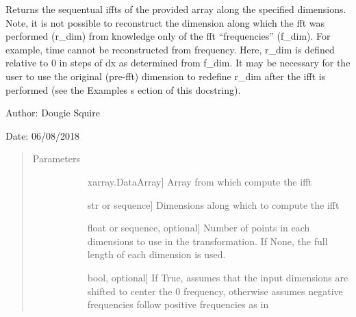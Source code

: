 \documentclass[letterpaper,10pt,english]{sphinxmanual}
\begin{document}

\begin{fulllineitems}
\label{\detokenize{utils_doc:utils.ifft}}
Returns the sequentual iffts of the provided array along the specified dimensions. Note, it is                 not possible to reconstruct the  dimension along which the fft was performed (r\_dim) from                 knowledge only of the fft “frequencies” (f\_dim). For example, time cannot be reconstructed from                 frequency. Here, r\_dim is defined relative to 0 in steps of dx as determined from f\_dim. It may                 be necessary for the user to use the original (pre-fft) dimension to redefine r\_dim after the                ifft is performed (see the Examples s ection of this docstring).

\begin{DUlineblock}{0em}
\item[] Author: Dougie Squire
\item[] Date: 06/08/2018
\end{DUlineblock}
\begin{quote}\begin{description}
\item[{Parameters}] \leavevmode\begin{description}
\item[{}] \leavevmode{[}xarray.DataArray{]}
Array from which compute the ifft

\item[{}] \leavevmode{[}str or sequence{]}
Dimensions along which to compute the ifft

\item[{}] \leavevmode{[}float or sequence, optional{]}
Number of points in each dimensions to use in the transformation. If None, the full length                    of each dimension is used.

\item[{}] \leavevmode{[}bool, optional{]}
If True, assumes that the input dimensions are shifted to center the 0 frequency, otherwise                     assumes negative frequencies follow positive frequencies as in 

\end{description}


\end{description}
\end{quote}
\end{fulllineitems}
\end{document}
